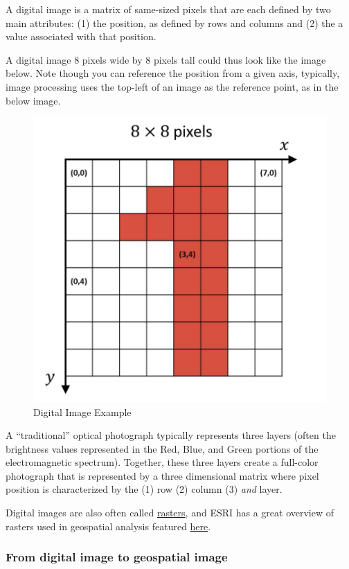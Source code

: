 \documentclass[
]{article}
\begin{document}
A digital image is a matrix of same-sized pixels that are each defined by two main attributes: (1) the position, as defined by rows and columns and (2) the a value associated with that position.

A digital image 8 pixels wide by 8 pixels tall could thus look like the image below. Note though you can reference the position from a given axis, typically, image processing uses the top-left of an image as the reference point, as in the below image.

\begin{figure}

{\centering \includegraphics[width=0.5\linewidth]{./im/im_02_01} 

}

\caption{Digital Image Example}\label{fig:digimage}
\end{figure}

A ``traditional'' optical photograph typically represents three layers (often the brightness values represented in the Red, Blue, and Green portions of the electromagnetic spectrum). Together, these three layers create a full-color photograph that is represented by a three dimensional matrix where pixel position is characterized by the (1) row (2) column (3) \emph{and} layer.

Digital images are also often called \href{https://en.wikipedia.org/wiki/Raster_graphics}{rasters}, and ESRI has a great overview of rasters used in geospatial analysis featured \href{https://desktop.arcgis.com/en/arcmap/10.3/manage-data/raster-and-images/what-is-raster-data.htm}{here}.

\hypertarget{from-digital-image-to-geospatial-image}{%
\subsubsection{From digital image to geospatial image}\label{from-digital-image-to-geospatial-image}}
\end{document}
